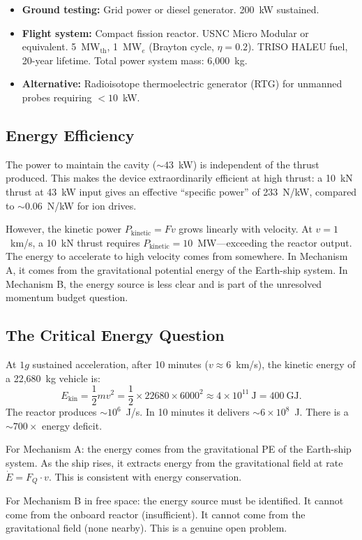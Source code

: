 \documentclass[12pt,aps,prd,superscriptaddress,nofootinbib,longbibliography]{revtex4-2}
\begin{document}
\begin{itemize}
\item \textbf{Ground testing:} Grid power or diesel generator.  200~kW
sustained.
\item \textbf{Flight system:} Compact fission reactor.  USNC Micro Modular
or equivalent.  5~MW$_{\mathrm{th}}$, 1~MW$_e$ (Brayton cycle, $\eta = 0.2$).
TRISO HALEU fuel, 20-year lifetime.  Total power system mass: 6,000~kg.
\item \textbf{Alternative:} Radioisotope thermoelectric generator (RTG)
for unmanned probes requiring $< 10$~kW.
\end{itemize}

\subsection{Energy Efficiency}

The power to maintain the cavity ($\sim 43$~kW) is independent of the
thrust produced.  This makes the device extraordinarily efficient at
high thrust: a 10~kN thrust at 43~kW input gives an effective
``specific power'' of 233~N/kW, compared to $\sim 0.06$~N/kW for ion
drives.

However, the kinetic power $P_{\mathrm{kinetic}} = Fv$ grows linearly
with velocity.  At $v = 1$~km/s, a 10~kN thrust requires
$P_{\mathrm{kinetic}} = 10$~MW---exceeding the reactor output.  The
energy to accelerate to high velocity comes from somewhere.  In
Mechanism A, it comes from the gravitational potential energy of the
Earth-ship system.  In Mechanism B, the energy source is less clear
and is part of the unresolved momentum budget question.

\subsection{The Critical Energy Question}

\begin{tcolorbox}[colback=yellow!5!white, colframe=yellow!50!black,
  title=Unresolved: Energy Source for Kinetic Energy]
At $1g$ sustained acceleration, after 10 minutes ($v \approx 6$~km/s),
the kinetic energy of a 22,680~kg vehicle is:
\begin{equation}
E_{\mathrm{kin}} = \frac{1}{2}mv^2 = \frac{1}{2} \times 22680 \times 6000^2
\approx 4 \times 10^{11}~\mathrm{J} = 400~\mathrm{GJ}.
\end{equation}
The reactor produces $\sim 10^6$~J/s.  In 10 minutes it delivers
$\sim 6 \times 10^8$~J.  There is a $\sim 700\times$ energy deficit.

For Mechanism A: the energy comes from the gravitational PE of the
Earth-ship system.  As the ship rises, it extracts energy from the
gravitational field at rate $\dot{E} = F_Q \cdot v$.  This is consistent
with energy conservation.

For Mechanism B in free space: the energy source must be identified.
It cannot come from the onboard reactor (insufficient).  It cannot come
from the gravitational field (none nearby).  This is a genuine open
problem.
\end{tcolorbox}
\end{document}
